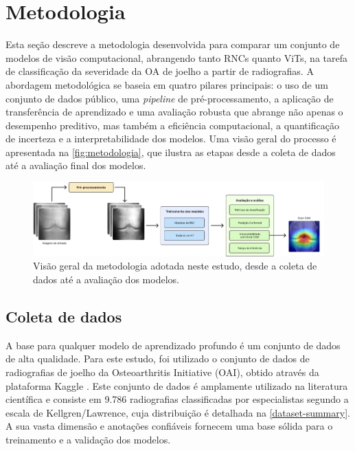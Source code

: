 \chapter{Metodologia}\label{cap:proposta}

Esta seção descreve a metodologia desenvolvida para comparar um conjunto de modelos de visão computacional, abrangendo tanto RNCs quanto ViTs, na tarefa de classificação da severidade da OA de joelho a partir de radiografias. A abordagem metodológica se baseia em quatro pilares principais: o uso de um conjunto de dados público, uma \textit{pipeline} de pré-processamento, a aplicação de transferência de aprendizado e uma avaliação robusta que abrange não apenas o desempenho preditivo, mas também a eficiência computacional, a quantificação de incerteza e a interpretabilidade dos modelos. Uma visão geral do processo é apresentada na \autoref{fig:metodologia}, que ilustra as etapas desde a coleta de dados até a avaliação final dos modelos.

\begin{figure}[!htbp]
    \centering
    \includegraphics[width=\linewidth]{figs/metodologia-pgc.png}
    \caption{Visão geral da metodologia adotada neste estudo, desde a coleta de dados até a avaliação dos modelos.}
    \label{fig:metodologia}
\end{figure}

\section{Coleta de dados}

A base para qualquer modelo de aprendizado profundo é um conjunto de dados de alta qualidade. Para este estudo, foi utilizado o conjunto de dados de radiografias de joelho da Osteoarthritis Initiative (OAI), obtido através da plataforma Kaggle \cite{dataset-kaggle}. Este conjunto de dados é amplamente utilizado na literatura científica \cite{Tariq2023, Mohammed2023} e consiste em 9.786 radiografias classificadas por especialistas segundo a escala de Kellgren/Lawrence, cuja distribuição é detalhada na \autoref{dataset-summary}. A sua vasta dimensão e anotações confiáveis fornecem uma base sólida para o treinamento e a validação dos modelos.

